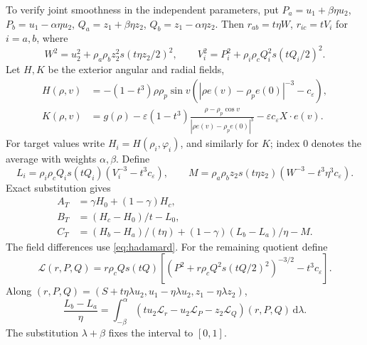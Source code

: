 \documentclass[11pt,a4paper]{article}
\numberwithin{equation}{section}
\theoremstyle{remark}
\newcommand{\eps}{\varepsilon}
\newcommand{\dd}{\,\mathrm d}
\begin{document}
To verify joint smoothness in the independent parameters, put $P_a=u_1+\beta\eta u_2$, $P_b=u_1-\alpha\eta u_2$, $Q_a=z_1+\beta\eta z_2$, $Q_b=z_1-\alpha\eta z_2$. Then $r_{ab}=t\eta W$, $r_{ic}=tV_i$ for $i=a,b$, where
\begin{equation}\label{eq:nest-distances}
 W^2=u_2^2+\rho_a\rho_bz_2^2s(t\eta z_2/2)^2,\qquad
 V_i^2=P_i^2+\rho_i\rho_cQ_i^2s(tQ_i/2)^2.
\end{equation}
Let $H,K$ be the exterior angular and radial fields,
\[
 \begin{aligned}
 H(\rho,v)&=-(1-t^3)\rho\rho_p\sin v
 (|\rho e(v)-\rho_pe(0)|^{-3}-c_\eps),\\
 K(\rho,v)&=g(\rho)-\eps(1-t^3)
 \frac{\rho-\rho_p\cos v}{|\rho e(v)-\rho_pe(0)|^3}-\eps c_\eps X\cdot e(v).
 \end{aligned}
\]
For target values write $H_i=H(\rho_i,\varphi_i)$, and similarly for $K$; index $0$ denotes the average with weights $\alpha,\beta$. Define
\[
 L_i=\rho_i\rho_cQ_i s(tQ_i)(V_i^{-3}-t^3c_\eps),\qquad
 M=\rho_a\rho_bz_2s(t\eta z_2)(W^{-3}-t^3\eta^3c_\eps).
\]
Exact substitution gives
\begin{equation}\label{eq:nest-angular}
 \begin{aligned}
 A_T&=\gamma H_0+(1-\gamma)H_c,\\
 B_T&=(H_c-H_0)/t-L_0,\\
 C_T&=(H_b-H_a)/(t\eta)+(1-\gamma)(L_b-L_a)/\eta-M.
 \end{aligned}
\end{equation}
The field differences use \eqref{eq:hadamard}. For the remaining quotient define
\[
 \mathcal L(r,P,Q)=r\rho_cQ s(tQ)
 [(P^2+r\rho_cQ^2s(tQ/2)^2)^{-3/2}-t^3c_\eps].
\]
Along $(r,P,Q)=(S+t\eta\lambda u_2,u_1-\eta\lambda u_2,z_1-\eta\lambda z_2)$,
\begin{equation}\label{eq:nest-kernel-difference}
 \frac{L_b-L_a}{\eta}
 =\int_{-\beta}^{\alpha}
 (tu_2\mathcal L_r-u_2\mathcal L_P-z_2\mathcal L_Q)(r,P,Q)\dd\lambda.
\end{equation}
The substitution $\lambda+\beta$ fixes the interval to $[0,1]$.
\end{document}
